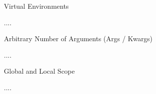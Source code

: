 \documentclass[
	11pt, 
]{beamer}
\begin{document}

\begin{frame}[fragile]{Virtual Environments}

....

\end{frame}



\begin{frame}[fragile]{Arbitrary Number of Arguments (Args / Kwargs)}

....

\end{frame}



\begin{frame}[fragile]{Global and Local Scope}

....

\end{frame}


\end{document}
